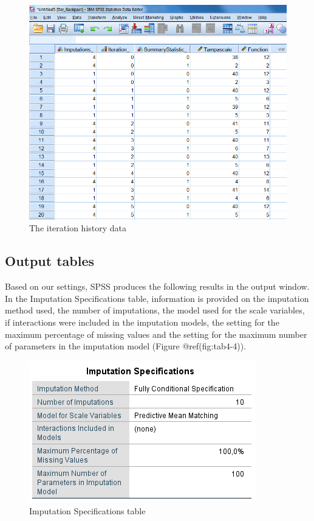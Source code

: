 \documentclass[
]{book}
\begin{document}
\begin{figure}

{\centering \includegraphics[width=0.9\linewidth]{images/fig4.12} 

}

\caption{The iteration history data}\label{fig:fig4-12}
\end{figure}

\hypertarget{output-tables}{%
\subsection{Output tables}\label{output-tables}}

Based on our settings, SPSS produces the following results in the output
window. In the Imputation Specifications table, information is provided
on the imputation method used, the number of imputations, the model used
for the scale variables, if interactions were included in the imputation
models, the setting for the maximum percentage of missing values and the
setting for the maximum number of parameters in the imputation model
(Figure @ref(fig:tab4-4)).

\begin{figure}

{\centering \includegraphics[width=0.9\linewidth]{images/tab4.4} 

}

\caption{Imputation Specifications table}\label{fig:tab4-4}
\end{figure}
\end{document}
